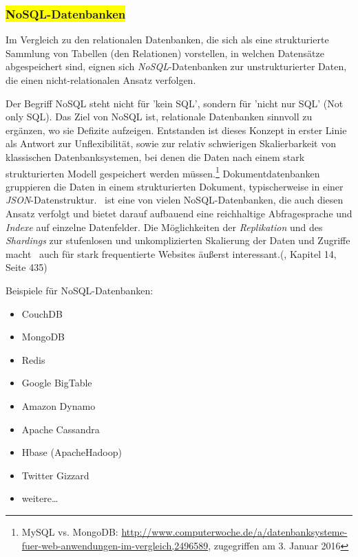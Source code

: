 \subsubsection{\colorbox{yellow}{NoSQL-Datenbanken}}

Im Vergleich zu den relationalen Datenbanken, die sich als eine strukturierte Sammlung von Tabellen (den Relationen) vorstellen, in welchen Datensätze abgespeichert sind, eignen sich \textit{NoSQL}-Datenbanken zur unstrukturierter Daten, die einen nicht-relationalen Ansatz verfolgen. 

Der Begriff NoSQL steht nicht für 'kein SQL', sondern für 'nicht nur SQL' (Not only SQL). Das Ziel von NoSQL ist, relationale Datenbanken sinnvoll zu ergänzen, wo sie Defizite aufzeigen. Entstanden ist dieses Konzept in erster Linie als Antwort zur Unflexibilität, sowie zur relativ schwierigen Skalierbarkeit von klassischen Datenbanksystemen, bei denen die Daten nach einem stark strukturierten Modell gespeichert werden müssen.\footnote{MySQL vs. MongoDB: \url{http://www.computerwoche.de/a/datenbanksysteme-fuer-web-anwendungen-im-vergleich,2496589}, zugegriffen am 3. Januar 2016} Dokumentdatenbanken gruppieren die Daten in einem strukturierten Dokument, typischerweise in einer \textit{JSON}-Datenstruktur. \mongo\ ist eine von vielen NoSQL-Datenbanken, die auch diesen Ansatz verfolgt und bietet darauf aufbauend eine reichhaltige Abfragesprache und \textit{Indexe} auf einzelne Datenfelder. Die Möglichkeiten der \textit{Replikation} und des \textit{Shardings} zur stufenlosen und unkomplizierten Skalierung der Daten und Zugriffe macht \mongo\ auch für stark frequentierte Websites äußerst interessant.(\cite{Hollosi.2012}, Kapitel 14, Seite 435)

Beispiele für NoSQL-Datenbanken:
\begin{multicols}{2}
\begin{itemize}
\item CouchDB
\item MongoDB
\item Redis
\item Google BigTable
\item Amazon Dynamo
\item Apache Cassandra
\item Hbase (ApacheHadoop)
\item Twitter Gizzard
\item weitere…
\end{itemize}
\end{multicols}

